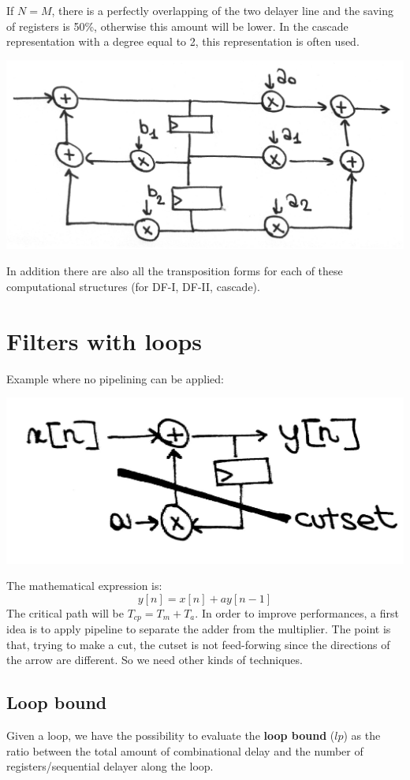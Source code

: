 If $N=M$, there is a perfectly overlapping of the two delayer line and the saving of registers is 50\%, otherwise this amount will be lower. In the cascade representation with a degree equal to 2, this representation is often used.
\begin{center}
  \includegraphics[width=0.7\linewidth]{img/img1/08}
\end{center}

In addition there are also all the transposition forms for each of these computational structures (for DF-I, DF-II, cascade).


\section{Filters with loops}
Example where no pipelining can be applied:
\begin{center}
  \includegraphics[width=0.6\linewidth]{img/img1/09}
\end{center}

The mathematical expression is:
$$y[n]=x[n]+ay[n-1]$$
The critical path will be $T_{cp}=T_m+T_a$. In order to improve performances, a first idea is to apply pipeline to separate the adder from the multiplier. The point is that, trying to make a cut, the cutset is not feed-forwing since the directions of the arrow are different. So we need other kinds of techniques.

\subsection{Loop bound}
Given a loop, we have the possibility to evaluate the \textbf{loop bound} ($lp$) as the ratio between the total amount of combinational delay and the number of registers/sequential delayer along the loop.\\


